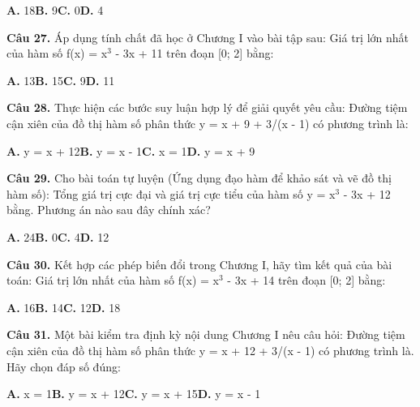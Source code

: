 \documentclass[11pt,a4paper]{article}
\begin{document}
\hspace*{1.5em}\textbf{A.} 18\quad\quad \textbf{B.} 9\quad\quad \textbf{C.} 0\quad\quad \textbf{D.} 4\par\vspace{2pt}
\textbf{\color{primary} Câu 27.} Áp dụng tính chất đã học ở Chương I vào bài tập sau: Giá trị lớn nhất của hàm số f(x) = x$^3$ - 3x + 11 trên đoạn [0; 2] bằng:\par
\hspace*{1.5em}\textbf{A.} 13\quad\quad \textbf{B.} 15\quad\quad \textbf{C.} 9\quad\quad \textbf{D.} 11\par\vspace{2pt}
\textbf{\color{primary} Câu 28.} Thực hiện các bước suy luận hợp lý để giải quyết yêu cầu: Đường tiệm cận xiên của đồ thị hàm số phân thức y = x + 9 + 3/(x - 1) có phương trình là:\par
\hspace*{1.5em}\textbf{A.} y = x + 12\quad\quad \textbf{B.} y = x - 1\quad\quad \textbf{C.} x = 1\quad\quad \textbf{D.} y = x + 9\par\vspace{2pt}
\textbf{\color{primary} Câu 29.} Cho bài toán tự luyện (Ứng dụng đạo hàm để khảo sát và vẽ đồ thị hàm số): Tổng giá trị cực đại và giá trị cực tiểu của hàm số y = x$^3$ - 3x + 12 bằng. Phương án nào sau đây chính xác?\par
\hspace*{1.5em}\textbf{A.} 24\quad\quad \textbf{B.} 0\quad\quad \textbf{C.} 4\quad\quad \textbf{D.} 12\par\vspace{2pt}
\textbf{\color{primary} Câu 30.} Kết hợp các phép biến đổi trong Chương I, hãy tìm kết quả của bài toán: Giá trị lớn nhất của hàm số f(x) = x$^3$ - 3x + 14 trên đoạn [0; 2] bằng:\par
\hspace*{1.5em}\textbf{A.} 16\quad\quad \textbf{B.} 14\quad\quad \textbf{C.} 12\quad\quad \textbf{D.} 18\par\vspace{2pt}
\textbf{\color{primary} Câu 31.} Một bài kiểm tra định kỳ nội dung Chương I nêu câu hỏi: Đường tiệm cận xiên của đồ thị hàm số phân thức y = x + 12 + 3/(x - 1) có phương trình là. Hãy chọn đáp số đúng:\par
\hspace*{1.5em}\textbf{A.} x = 1\quad\quad \textbf{B.} y = x + 12\quad\quad \textbf{C.} y = x + 15\quad\quad \textbf{D.} y = x - 1\par\vspace{2pt}
\end{document}
